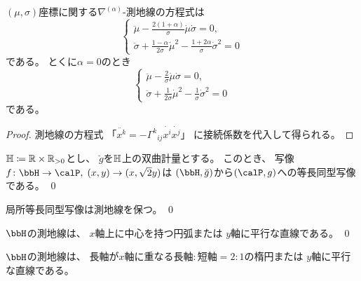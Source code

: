 \documentclass[report]{jlreq}
\begin{document}
\begin{proposition}[測地線方程式]
    $(\mu, \sigma)$座標に関する$\nabla^{(\alpha)}$-測地線の方程式は
    \begin{equation}
        \begin{cases}
            \ddot{\mu}
                - \frac{2 (1 + \alpha)}{\sigma} \dot{\mu} \dot{\sigma}
                = 0,
                \\
            \ddot{\sigma}
                + \frac{1 - \alpha}{2 \sigma} \dot{\mu}^2
                - \frac{1 + 2 \alpha}{\sigma} \dot{\sigma}^2
                = 0
        \end{cases}
    \end{equation}
    である。
    とくに$\alpha = 0$のとき
    \begin{equation}
        \begin{cases}
            \ddot{\mu}
                - \frac{2}{\sigma} \dot{\mu} \dot{\sigma}
                = 0,
                \\
            \ddot{\sigma}
                + \frac{1}{2 \sigma} \dot{\mu}^2
                - \frac{1}{\sigma} \dot{\sigma}^2
                = 0
        \end{cases}
    \end{equation}
    である。
\end{proposition}

\begin{proof}
    測地線の方程式
    「$\ddot{x^k} = - {\Gamma^k}_{ij} \dot{x^i} \dot{x^j}$」
    に接続係数を代入して得られる。
\end{proof}

\begin{fact}
    $\mathbb{H} \coloneqq \mathbb{R} \times \mathbb{R}_{> 0}$とし、
    $\breve{g}$を$\mathbb{H}$上の双曲計量とする。
    このとき、
    写像$f \colon \bbH \to \calP, \; (x, y) \to (x, \sqrt{2} y)$は
    $(\bbH, \breve{g})$から$(\calP, g)$への等長同型写像である。
    \qed
\end{fact}

\begin{fact}
    局所等長同型写像は測地線を保つ。
    \qed
\end{fact}

\begin{fact}
    $\bbH$の測地線は、
    $x$軸上に中心を持つ円弧または
    $y$軸に平行な直線である。
    \qed
\end{fact}

\begin{proposition}
    $\bbH$の測地線は、
    長軸が$x$軸に重なる$\text{長軸}:\text{短軸} = 2:1$の楕円または
    $y$軸に平行な直線である。
\end{proposition}
\end{document}

